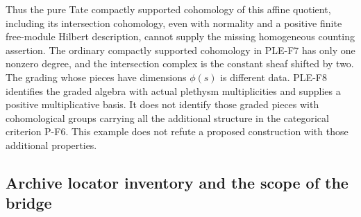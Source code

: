 Thus the pure Tate compactly supported cohomology of this affine
quotient, including its intersection cohomology, even with normality
and a positive finite free-module Hilbert description, cannot supply
the missing homogeneous counting assertion.
The ordinary compactly supported cohomology in PLE-F7 has only one
nonzero degree, and the intersection complex is the constant sheaf
shifted by two. The grading whose pieces have dimensions $\phi(s)$ is
different data. PLE-F8 identifies the graded algebra with actual
plethysm multiplicities and supplies a positive multiplicative basis.
It does not identify those graded pieces with cohomological groups
carrying all the additional structure in the categorical criterion
P-F6. This example does not refute a proposed construction with
those additional properties.

\subsection{Archive locator inventory and the scope of the bridge}
